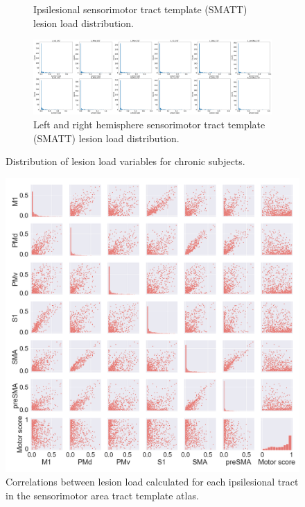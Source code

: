 \documentclass[10pt]{article}
\begin{document}
\begin{figure}
\begin{subfigure}{0.5\textwidth}
  \caption{Ipsilesional sensorimotor tract template (SMATT) lesion load distribution.}
  \label{fig:sfig2}
\end{subfigure}
\begin{subfigure}{1\textwidth}
  \centering
  \includegraphics[width=1\linewidth]{figures/all2h_lesionload.png}
  \caption{Left and right hemisphere sensorimotor tract template (SMATT) lesion load distribution.}
  \label{fig:sfig2}
\end{subfigure}
\caption{Distribution of lesion load variables for chronic subjects.}
\label{lesion_load_dist}
\end{figure}


\begin{figure}[ht]
\centering
\includegraphics[width=0.8\linewidth]{figures/SMATT_scatterplts.png}
\caption{Correlations between lesion load calculated for each ipsilesional tract in the sensorimotor area tract template atlas.}
\label{smatt_pairwise_correlations}
\end{figure}
\end{document}
